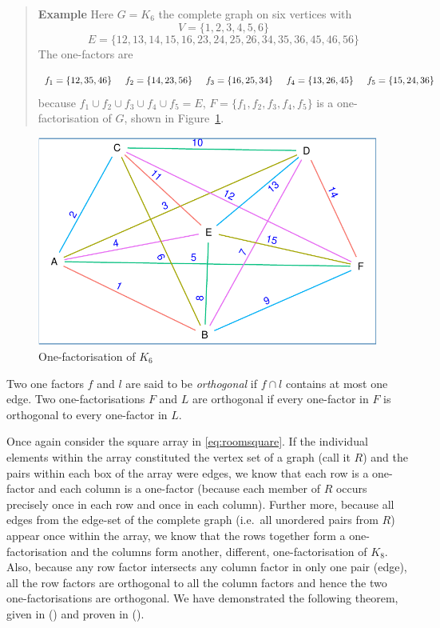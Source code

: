\documentclass[
  11pt,
  a4paper]{book}
\newcounter{examplecounter}
\begin{document}
\begin{quote}  \textbf{Example } \quad 
Here
$G = K_6$
the complete graph on six vertices with
$$V = \{1, 2, 3, 4, 5, 6\}$$
$$E = \{12, 13, 14, 15, 16, 23, 24, 25, 26, 34, 35, 36, 45, 46, 56\}$$
The one-factors are

$$
f_1 = \{12, 35, 46\} \hspace{0.5cm}
f_2 = \{14, 23, 56\} \hspace{0.5cm}
f_3 = \{16, 25, 34\} \hspace{0.5cm}
f_4 = \{13, 26, 45\} \hspace{0.5cm} 
f_5 = \{15, 24, 36\}
$$
because
$f_1 \cup f_2 \cup f_3 \cup f_4 \cup f_5 = E$,
$F = \{f_1, f_2, f_3, f_4, f_5\}$
is a one-factorisation of
$G$,
shown in Figure~\ref{fig:one-factorisation}.
 \end{quote}

\begin{figure}
\centering
\includegraphics{figure/one-factorisation-1.pdf}
\caption{\label{fig:one-factorisation}One-factorisation of \(K_6\)}
\end{figure}

Two one factors \(f\) and \(l\) are said to be \emph{orthogonal} if
\(f \cap l\) contains at most one edge. Two one-factorisations
\(F\) and \(L\) are orthogonal if every one-factor in \(F\) is
orthogonal to every one-factor in \(L\).

Once again consider the square array in
\eqref{eq:roomsquare}.
If the individual elements within the array constituted the
vertex set of a graph (call it \(R\)) and the pairs within
each box of the array were edges, we know that each row is a
one-factor and each column is a one-factor (because each
member of \(R\) occurs precisely once in each row and once in
each column). Further more, because all edges from the
edge-set of the complete graph (i.e.~all unordered pairs
from \(R\)) appear once within the array, we know that the
rows together form a one-factorisation and the columns form
another, different, one-factorisation of \(K_8\). Also,
because any row factor intersects any column factor in only
one pair (edge), all the row factors are orthogonal to all
the column factors and hence the two one-factorisations are
orthogonal. We have demonstrated the following theorem,
given in
(\textcite{dinitz_contemporary_1992})
and proven in
(\textcite{nemeth_study_1969}).
\end{document}
